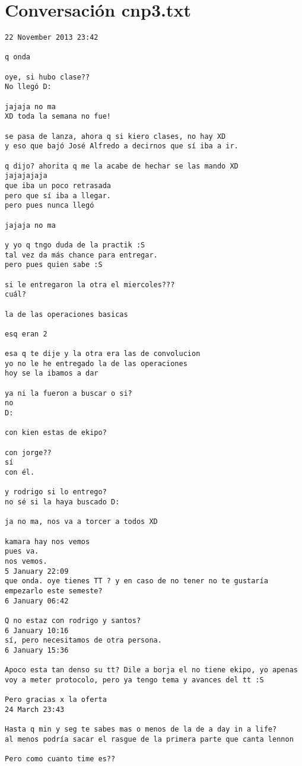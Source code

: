 \section{Conversaci\'on cnp3.txt}
\begin{verbatim}
22 November 2013 23:42

q onda

oye, si hubo clase??
No llegó D:

jajaja no ma
XD toda la semana no fue!

se pasa de lanza, ahora q si kiero clases, no hay XD
y eso que bajó José Alfredo a decirnos que sí iba a ir.

q dijo? ahorita q me la acabe de hechar se las mando XD
jajajajaja
que iba un poco retrasada
pero que sí iba a llegar.
pero pues nunca llegó

jajaja no ma

y yo q tngo duda de la practik :S
tal vez da más chance para entregar.
pero pues quien sabe :S

si le entregaron la otra el miercoles???
cuál?

la de las operaciones basicas

esq eran 2

esa q te dije y la otra era las de convolucion
yo no le he entregado la de las operaciones
hoy se la ibamos a dar

ya ni la fueron a buscar o si?
no
D:

con kien estas de ekipo?

con jorge??
sí
con él.

y rodrigo si lo entrego?
no sé si la haya buscado D:

ja no ma, nos va a torcer a todos XD

kamara hay nos vemos
pues va.
nos vemos.
5 January 22:09
que onda. oye tienes TT ? y en caso de no tener no te gustaría empezarlo este semeste? 
6 January 06:42

Q no estaz con rodrigo y santos?
6 January 10:16
sí, pero necesitamos de otra persona.
6 January 15:36

Apoco esta tan denso su tt? Dile a borja el no tiene ekipo, yo apenas voy a meter protocolo, pero ya tengo tema y avances del tt :S

Pero gracias x la oferta 
24 March 23:43

Hasta q min y seg te sabes mas o menos de la de a day in a life?
al menos podría sacar el rasgue de la primera parte que canta lennon

Pero como cuanto time es??


\end{verbatim}
